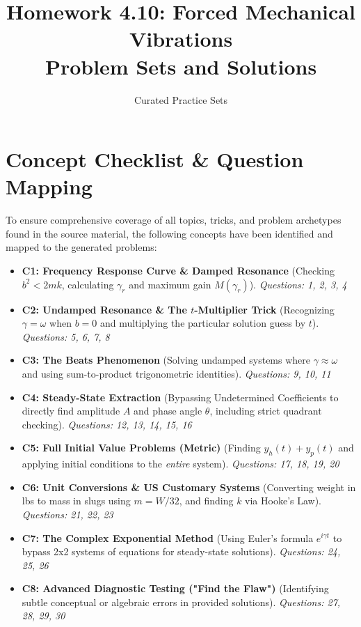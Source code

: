 \documentclass[11pt]{article}
\title{Homework 4.10: Forced Mechanical Vibrations \\ Problem Sets and Solutions}
\author{Curated Practice Sets}
\date{}
\begin{document}
\maketitle
\tableofcontents
\newpage

\section{Concept Checklist \& Question Mapping}
To ensure comprehensive coverage of all topics, tricks, and problem archetypes found in the source material, the following concepts have been identified and mapped to the generated problems:

\begin{itemize}
    \item \textbf{C1: Frequency Response Curve \& Damped Resonance} (Checking $b^2 < 2mk$, calculating $\gamma_r$ and maximum gain $M(\gamma_r)$). \textit{Questions: 1, 2, 3, 4}
    \item \textbf{C2: Undamped Resonance \& The $t$-Multiplier Trick} (Recognizing $\gamma = \omega$ when $b=0$ and multiplying the particular solution guess by $t$). \textit{Questions: 5, 6, 7, 8}
    \item \textbf{C3: The Beats Phenomenon} (Solving undamped systems where $\gamma \approx \omega$ and using sum-to-product trigonometric identities). \textit{Questions: 9, 10, 11}
    \item \textbf{C4: Steady-State Extraction} (Bypassing Undetermined Coefficients to directly find amplitude $A$ and phase angle $\theta$, including strict quadrant checking). \textit{Questions: 12, 13, 14, 15, 16}
    \item \textbf{C5: Full Initial Value Problems (Metric)} (Finding $y_h(t) + y_p(t)$ and applying initial conditions to the \textit{entire} system). \textit{Questions: 17, 18, 19, 20}
    \item \textbf{C6: Unit Conversions \& US Customary Systems} (Converting weight in lbs to mass in slugs using $m = W/32$, and finding $k$ via Hooke's Law). \textit{Questions: 21, 22, 23}
    \item \textbf{C7: The Complex Exponential Method} (Using Euler's formula $e^{i\gamma t}$ to bypass 2x2 systems of equations for steady-state solutions). \textit{Questions: 24, 25, 26}
    \item \textbf{C8: Advanced Diagnostic Testing ("Find the Flaw")} (Identifying subtle conceptual or algebraic errors in provided solutions). \textit{Questions: 27, 28, 29, 30}
\end{itemize}
\end{document}
